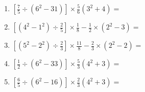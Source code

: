 \documentclass[12pt]{article}
\begin{document}
\begin{enumerate}[ itemsep=1.5cm]
	\item $\displaystyle \left[ \frac{7}{5} \div \left( 6^2 - 31 \right) \right] \times \frac{5}{6} \left( 3^2 + 4 \right) =$
	\item $\displaystyle \left[ \left( 4^2 - 1^2 \right) \div \frac{2}{5} \right] \times \frac{1}{8} - \frac{1}{2} \times \left( 2^2 - 3 \right) =$
	\item $\displaystyle \left[ \left( 5^2 - 2^2 \right) \div \frac{2}{3} \right] \times \frac{11}{8} - \frac{2}{3} \times \left( 2^2 - 2 \right) =$
	\item $\displaystyle \left[ \frac{1}{2} \div \left( 6^2 - 33 \right) \right] \times \frac{5}{3} \left( 4^2 + 3 \right) =$
	\item $\displaystyle \left[ \frac{6}{5} \div \left( 6^2 - 16 \right) \right] \times \frac{2}{3} \left( 4^2 + 3 \right) =$
\end{enumerate}
\end{document}
